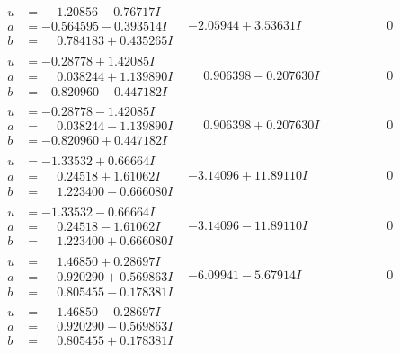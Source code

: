 \documentclass[1p]{elsarticle_modified}
\theoremstyle{definition}
\begin{document}
$$\begin{array}{c|c|c}
\begin{aligned}
u &= \phantom{-}1.20856 - 0.76717 I \\
a &= -0.564595 - 0.393514 I \\
b &= \phantom{-}0.784183 + 0.435265 I\end{aligned}
 & -2.05944 + 3.53631 I & \phantom{-0.000000 } 0 \\ \hline\begin{aligned}
u &= -0.28778 + 1.42085 I \\
a &= \phantom{-}0.038244 + 1.139890 I \\
b &= -0.820960 - 0.447182 I\end{aligned}
 & \phantom{-}0.906398 - 0.207630 I & \phantom{-0.000000 } 0 \\ \hline\begin{aligned}
u &= -0.28778 - 1.42085 I \\
a &= \phantom{-}0.038244 - 1.139890 I \\
b &= -0.820960 + 0.447182 I\end{aligned}
 & \phantom{-}0.906398 + 0.207630 I & \phantom{-0.000000 } 0 \\ \hline\begin{aligned}
u &= -1.33532 + 0.66664 I \\
a &= \phantom{-}0.24518 + 1.61062 I \\
b &= \phantom{-}1.223400 - 0.666080 I\end{aligned}
 & -3.14096 + 11.89110 I & \phantom{-0.000000 } 0 \\ \hline\begin{aligned}
u &= -1.33532 - 0.66664 I \\
a &= \phantom{-}0.24518 - 1.61062 I \\
b &= \phantom{-}1.223400 + 0.666080 I\end{aligned}
 & -3.14096 - 11.89110 I & \phantom{-0.000000 } 0 \\ \hline\begin{aligned}
u &= \phantom{-}1.46850 + 0.28697 I \\
a &= \phantom{-}0.920290 + 0.569863 I \\
b &= \phantom{-}0.805455 - 0.178381 I\end{aligned}
 & -6.09941 - 5.67914 I & \phantom{-0.000000 } 0 \\ \hline\begin{aligned}
u &= \phantom{-}1.46850 - 0.28697 I \\
a &= \phantom{-}0.920290 - 0.569863 I \\
b &= \phantom{-}0.805455 + 0.178381 I\end{aligned}

\end{array}$$
\end{document}
